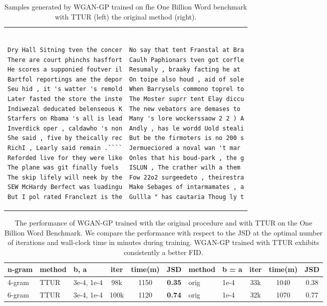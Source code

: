 \documentclass{article}
\begin{document}
\begin{table}[H]
\centering
\caption[Samples of the One Billion Word benchmark generated by
WGAN-GP.]{Samples generated by WGAN-GP trained on fhe One Billion Word benchmark
with TTUR (left) the original method (right).
\label{tab:lang_samp}}
\begin{tabular}{ll}
\begin{minipage}{0.49\textwidth}
\begin{verbatim}

Dry Hall Sitning tven the concer
There are court phinchs hasffort
He scores a supponied foutver il
Bartfol reportings ane the depor
Seu hid , it 's watter 's remold
Later fasted the store the inste
Indiwezal deducated belenseous K
Starfers on Rbama 's all is lead
Inverdick oper , caldawho 's non
She said , five by theically rec
RichI , Learly said remain .````
Reforded live for they were like
The plane was git finally fuels
The skip lifely will neek by the
SEW McHardy Berfect was luadingu
But I pol rated Franclezt is the
\end{verbatim}
\end{minipage}
&
\begin{minipage}{0.49\textwidth}
\begin{verbatim}

No say that tent Franstal at Bra
Caulh Paphionars tven got corfle
Resumaly , braaky facting he at
On toipe also houd , aid of sole
When Barrysels commono toprel to
The Moster suprr tent Elay diccu
The new vebators are demases to
Many 's lore wockerssaow 2 2 ) A
Andly , has le wordd Uold steali
But be the firmoters is no 200 s
Jermueciored a noval wan 't mar
Onles that his boud-park , the g
ISLUN , The crather wilh a them
Fow 22o2 surgeedeto , theirestra
Make Sebages of intarmamates , a
Gullla " has cautaria Thoug ly t
\end{verbatim}
\end{minipage}
\end{tabular}
\end{table}


\begin{table}[htp]
\begin{center}
\caption[Results WGAN-GP on One Billion Word]{The performance of WGAN-GP trained
with the original procedure and with TTUR on the One Billion Word Benchmark. We
compare the performance with respect to the JSD at the optimal number
of iterations and wall-clock time in minutes during training.
WGAN-GP trained with TTUR exhibits consistently a better FID.}
\label{tab:wgan_gp_lang}
\begin{tabular}{lllcccllccc}
 \toprule
  n-gram & method & b, a & iter & time(m) & JSD &  method &
  b = a  & iter & time(m) & JSD \\
 \midrule
 4-gram & TTUR &   3e-4, 1e-4 & 98k & 1150 &  {\bf 0.35} &
 orig &   1e-4 & 33k & 1040 & 0.38   \\
 6-gram & TTUR &   3e-4, 1e-4 & 100k & 1120 &  {\bf 0.74} &
 orig &   1e-4 & 32k & 1070 & 0.77   \\
 \bottomrule
 \end{tabular}
 \end{center}
\end{table}
\end{document}
